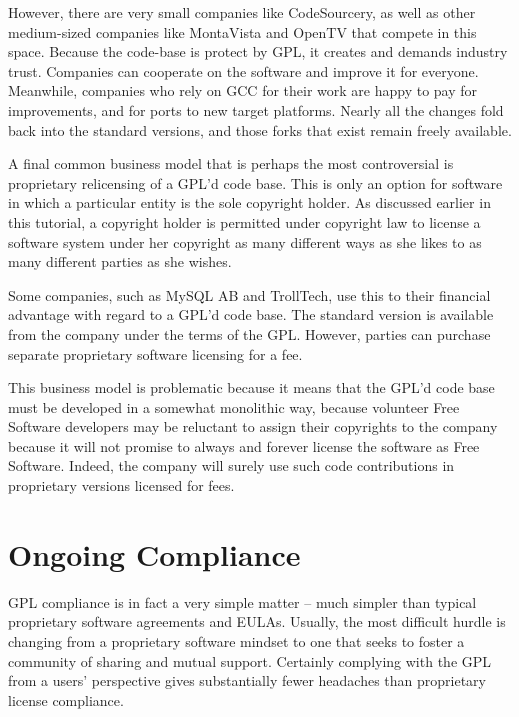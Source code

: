 However, there are very small companies like CodeSourcery, as well as
other medium-sized companies like MontaVista and OpenTV that compete in
this space. Because the code-base is protect by GPL, it creates and
demands industry trust. Companies can cooperate on the software and
improve it for everyone. Meanwhile, companies who rely on GCC for their
work are happy to pay for improvements, and for ports to new target
platforms. Nearly all the changes fold back into the standard
versions, and those forks that exist remain freely available.

\medskip

\label{Proprietary Relicensing}

A final common business model that is perhaps the most controversial is
proprietary relicensing of a GPL'd code base. This is only an option for
software in which a particular entity is the sole copyright holder. As
discussed earlier in this tutorial, a copyright holder is permitted under
copyright law to license a software system under her copyright as many
different ways as she likes to as many different parties as she wishes.

Some companies, such as MySQL AB and TrollTech, use this to their
financial advantage with regard to a GPL'd code base. The standard
version is available from the company under the terms of the GPL\@.
However, parties can purchase separate proprietary software licensing for
a fee.

This business model is problematic because it means that the GPL'd code
base must be developed in a somewhat monolithic way, because volunteer
Free Software developers may be reluctant to assign their copyrights to
the company because it will not promise to always and forever license the
software as Free Software. Indeed, the company will surely use such code
contributions in proprietary versions licensed for fees.

\section{Ongoing Compliance}

GPL compliance is in fact a very simple matter -- much simpler than
typical proprietary software agreements and EULAs. Usually, the most
difficult hurdle is changing from a proprietary software mindset to one
that seeks to foster a community of sharing and mutual support. Certainly
complying with the GPL from a users' perspective gives substantially fewer
headaches than proprietary license compliance.

